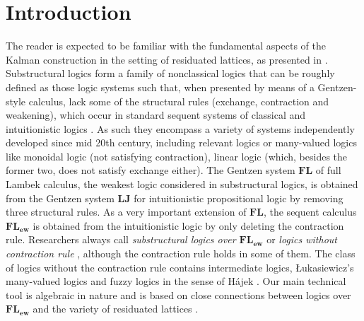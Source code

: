 \documentclass[final,12pt,times]{elsarticle}
\theoremstyle{plain}
\theoremstyle{definition}
\theoremstyle{break}
\begin{document}
\section{Introduction}
\label{intro}

The reader is expected to be familiar with the fundamental aspects of the Kalman construction in the setting of residuated lattices, as presented in \cite{Castiglionib,Castiglionic,Sagastume,Sagastume1,Tsinakis}.
  Substructural logics form a family of nonclassical logics that can be roughly defined as those logic systems such that, when presented by means of a Gentzen-style calculus, lack some of the structural rules (exchange, contraction and weakening), which occur in standard sequent systems of classical and intuitionistic logics \cite{Galatos,Metcalfe}. As such they encompass a variety of systems independently developed since mid 20th century, including relevant logics or many-valued logics like monoidal logic (not satisfying contraction), linear logic (which, besides the former two, does not satisfy exchange either).  The  Gentzen system $\mathbf{FL}$ of full Lambek calculus, the weakest logic considered in substructural logics, is obtained from the Gentzen system $\mathbf{LJ}$ for intuitionistic propositional logic by removing three structural rules. As a very important extension of $\mathbf{FL}$, the sequent calculus $\mathbf{FL_{ew}}$ is obtained from the intuitionistic logic by only deleting the contraction rule. Researchers always call \emph{substructural logics over $\mathbf{FL_{ew}}$} or \emph{logics without contraction rule} \cite{Ono}, although the contraction rule holds in some of them. The class of logics without the contraction rule contains intermediate logics, {\L}ukasiewicz's many-valued logics \cite{Chang} and fuzzy logics in the sense of H\'{a}jek \cite{Hajek}. Our main technical tool is algebraic in nature and is based on close connections between logics over $\mathbf{FL_{ew}}$ and the variety of residuated lattices \cite{Blount,Metcalfe,Cintula1,Galatos,Ono}.
  
\end{document}
